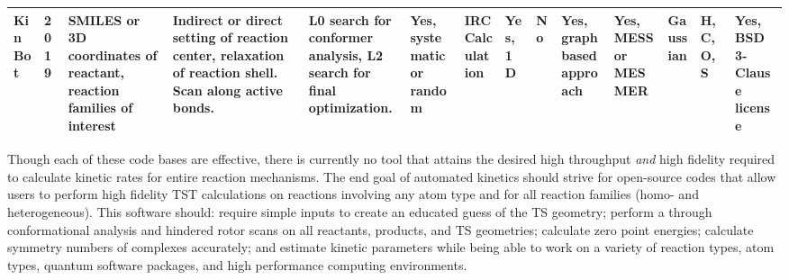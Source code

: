 \documentclass[preprint, 11pt]{elsarticle} %
\begin{document}
\begin{table}[h!]
\begin{center}
\begin{singlespace}
\begin{adjustbox}{angle=90}
\begin{scriptsize}
\begin{tabular}{m{0.45in}||m{0.25in} | m{0.45in} | m{0.8in} | m{0.7in}| m{0.5in}| m{0.5in }|m{0.45in}| m{0.45in}| m{0.5in}| m{0.45in}| m{0.5in}| m{0.5in} | m{0.45in}}
    \hline
    KinBot  & 2019 & SMILES or 3D coordinates of reactant, reaction families of interest & Indirect or direct setting of reaction center, relaxation of reaction shell. Scan along active bonds.  & L0 search for conformer analysis, L2 search for final optimization. & Yes, systematic or random & IRC Calculation & Yes, 1D & No & Yes, graph based approach & Yes, MESS or MESMER & Gaussian & H, C, O, S & Yes, BSD 3-Clause license \\ 
    \hline
   
\end{tabular}
\end{scriptsize}
\end{adjustbox}
\end{singlespace}
\end{center}
\end{table}
\restoregeometry
Though each of these code bases are effective, there is currently no tool that attains the desired high throughput \textit{and} high fidelity required to calculate kinetic rates for entire reaction mechanisms.
The end goal of automated kinetics should strive for open-source codes that allow users to perform high fidelity TST calculations on reactions involving any atom type and for all reaction families (homo- and heterogeneous).
This software should: require simple inputs to create an educated guess of the TS geometry; perform a through conformational analysis and hindered rotor scans on all reactants, products, and TS geometries; calculate zero point energies; calculate symmetry numbers of complexes accurately; and estimate kinetic parameters while being able to work on a variety of reaction types, atom types, quantum software packages, and high performance computing environments.
\end{document}
